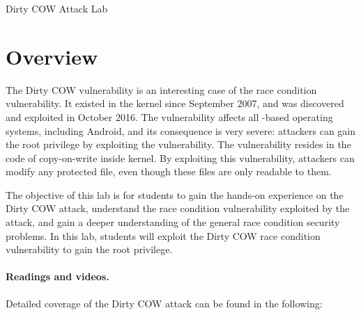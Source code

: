 




\newcommand{\cowFigs}{./Figs}





\begin{center}
{\LARGE Dirty COW Attack Lab}
\end{center}




\section{Overview}

The Dirty COW vulnerability is an interesting case of
the race condition vulnerability. It existed in the \linux kernel since
September 2007, and was discovered and exploited in October 2016.
The vulnerability affects all \linux-based operating systems, including
Android, and its consequence is very severe: attackers can gain the root
privilege by exploiting the vulnerability. The vulnerability resides
in the code of copy-on-write inside \linux kernel. By exploiting this vulnerability, attackers
can modify any protected file, even though these files are only readable to them.

The objective of this lab is for students to gain the hands-on experience on the Dirty COW
attack, understand the race condition vulnerability exploited by the attack, and 
gain a deeper understanding of the general race condition security problems. In this lab,
students will exploit the Dirty COW race condition vulnerability to gain the root privilege.  


\paragraph{Readings and videos.}
Detailed coverage of the Dirty COW attack can be found in the following:

